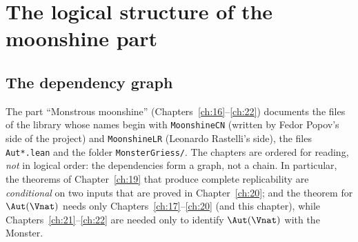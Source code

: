 \section{The logical structure of the moonshine part}\label{ch16:sec:roadmap}

\subsection{The dependency graph}

The part ``Monstrous moonshine'' (Chapters~\ref{ch:16}--\ref{ch:22}) documents the files of the library whose names
begin with \texttt{MoonshineCN} (written by Fedor Popov's side of the project) and \texttt{MoonshineLR} (Leonardo
Rastelli's side), the files \texttt{Aut*.lean} and the folder \texttt{MonsterGriess/}.  The chapters are ordered for
reading, \emph{not} in logical order: the dependencies form a graph, not a chain.  In particular, the theorems of
Chapter~\ref{ch:19} that produce complete replicability are \emph{conditional} on two inputs that are proved in
Chapter~\ref{ch:20}; and the theorem for $\Aut(\Vnat)$ needs only Chapters~\ref{ch:17}--\ref{ch:20} (and this chapter),
while Chapters~\ref{ch:21}--\ref{ch:22} are needed only to identify $\Aut(\Vnat)$ with the Monster.

